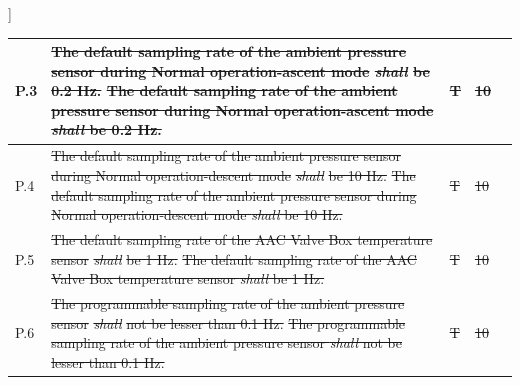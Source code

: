]\documentclass[a4paper,12pt,twoside]{article}
\providecommand{\DIFaddtex}[1]{{\protect\color{blue}\uwave{#1}}} %
\providecommand{\DIFdeltex}[1]{{\protect\color{red}\sout{#1}}}                      %
\providecommand{\DIFaddbegin}{} %
\providecommand{\DIFaddend}{} %
\providecommand{\DIFdelbegin}{} %
\providecommand{\DIFdelend}{} %
\providecommand{\DIFadd}[1]{\texorpdfstring{\DIFaddtex{#1}}{#1}} %
\providecommand{\DIFdel}[1]{\texorpdfstring{\DIFdeltex{#1}}{}} %
\newcommand{\DIFscaledelfig}{0.5}
\newlength{\DIFdelgraphicswidth} %
\newlength{\DIFdelgraphicsheight} %
\newcommand{\DIFaddincludegraphics}[2][]{{\color{blue}\fbox{\DIFOincludegraphics[#1]{#2}}}} %
\newcommand{\DIFdelincludegraphics}[2][]{%
\sbox{\DIFdelgraphicsbox}{\DIFOincludegraphics[#1]{#2}}%
\settoboxwidth{\DIFdelgraphicswidth}{\DIFdelgraphicsbox} %
\settoboxtotalheight{\DIFdelgraphicsheight}{\DIFdelgraphicsbox} %
\scalebox{\DIFscaledelfig}{%
\parbox[b]{\DIFdelgraphicswidth}{\usebox{\DIFdelgraphicsbox}\\[-\baselineskip] \rule{\DIFdelgraphicswidth}{0em}}\llap{\resizebox{\DIFdelgraphicswidth}{\DIFdelgraphicsheight}{%
\setlength{\unitlength}{\DIFdelgraphicswidth}%
\begin{picture}(1,1)%
\thicklines\linethickness{2pt} %
{\color[rgb]{1,0,0}\put(0,0){\framebox(1,1){}}}%
{\color[rgb]{1,0,0}\put(0,0){\line( 1,1){1}}}%
{\color[rgb]{1,0,0}\put(0,1){\line(1,-1){1}}}%
\end{picture}%
}\hspace*{3pt}}} %
} %
\DeclareRobustCommand{\DIFaddbegin}{\DIFOaddbegin \let\includegraphics\DIFaddincludegraphics} %
\DeclareRobustCommand{\DIFaddend}{\DIFOaddend \let\includegraphics\DIFOincludegraphics} %
\DeclareRobustCommand{\DIFdelbegin}{\DIFOdelbegin \let\includegraphics\DIFdelincludegraphics} %
\DeclareRobustCommand{\DIFdelend}{\DIFOaddend \let\includegraphics\DIFOincludegraphics} %
\begin{document}
\begin{longtable}[]{|m{}| m{} |m{} |m{}|m{}|}
P.3  & \DIFdelbegin \DIFdel{The default sampling rate of the ambient pressure sensor during Normal operation-ascent mode }\textit{\DIFdel{shall}} %
\DIFdel{be 0.2 Hz.                                                           }\DIFdelend \DIFaddbegin \st{The default sampling rate of the ambient pressure sensor during Normal operation-ascent mode \textit{shall} be 0.2 Hz.}\DIFadd{\textsuperscript{\ref{replaceSoftVeri}}                                                           }\DIFaddend &    \DIFdelbegin \DIFdel{T        }\DIFdelend \DIFaddbegin \DIFadd{-        }\DIFaddend & \DIFdelbegin \DIFdel{10            }\DIFdelend \DIFaddbegin \DIFadd{-        }\DIFaddend &        \\ \hline
P.4  & \DIFdelbegin \DIFdel{The default sampling rate of the ambient pressure sensor during Normal operation-descent mode }\textit{\DIFdel{shall}} %
\DIFdel{be 10 Hz.                                                           }\DIFdelend \DIFaddbegin \st{The default sampling rate of the ambient pressure sensor during Normal operation-descent mode \textit{shall} be 10 Hz.}\DIFadd{\textsuperscript{\ref{replaceSoftVeri}}                                                           }\DIFaddend &   \DIFdelbegin \DIFdel{T       }\DIFdelend \DIFaddbegin \DIFadd{-     }\DIFaddend & \DIFdelbegin \DIFdel{10            }\DIFdelend \DIFaddbegin \DIFadd{-    }\DIFaddend &        \\ \hline
P.5  & \DIFdelbegin \DIFdel{The default sampling rate of the AAC Valve Box temperature sensor }\textit{\DIFdel{shall}} %
\DIFdel{be 1 Hz.                                                                                        }\DIFdelend \DIFaddbegin \st{The default sampling rate of the AAC Valve Box temperature sensor \textit{shall} be 1 Hz.}\DIFadd{\textsuperscript{\ref{replaceSoftVeri}}                                                                                        }\DIFaddend &     \DIFdelbegin \DIFdel{T        }\DIFdelend \DIFaddbegin \DIFadd{-        }\DIFaddend &  \DIFdelbegin \DIFdel{10            }\DIFdelend \DIFaddbegin \DIFadd{-            }\DIFaddend &        \\ \hline
P.6  &\DIFdelbegin \DIFdel{The programmable sampling rate of the ambient pressure sensor }\textit{\DIFdel{shall}} %
\DIFdel{not be lesser than 0.1 Hz.                                                                          }\DIFdelend \DIFaddbegin \st{ The programmable sampling rate of the ambient pressure sensor \textit{shall} not be lesser than 0.1 Hz.}\DIFadd{\textsuperscript{\ref{replaceSoftVeri}}                                                                          }\DIFaddend &      \DIFdelbegin \DIFdel{T        }\DIFdelend \DIFaddbegin \DIFadd{-    }\DIFaddend & \DIFdelbegin \DIFdel{10            }\DIFdelend \DIFaddbegin \DIFadd{-            }\DIFaddend &        \\ \hline

\end{longtable}
\end{document}
